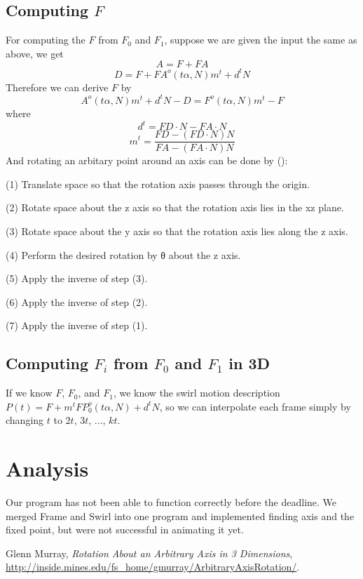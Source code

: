 \documentclass[twoside,11pt]{article}
\begin{document}
\subsection{Computing $F$}
For computing the $F$ from $F_0$ and $F_1$, suppose we are given the input the same as above, we get
\begin{equation}
A = F + FA
\end{equation}
\begin{equation}
D = F + FA^o (t\alpha, N) m^t + d^t N
\end{equation}
Therefore we can derive $F$ by
\begin{equation}
A^o (t\alpha, N) m^t + d^t N - D = F^o (t\alpha, N) m^t - F
\end{equation}
where
\begin{equation}
d^t = FD \cdot N - FA \cdot N 
\end{equation}
\begin{equation}
m^t = \frac{FD - (FD \cdot N) N }{FA - (FA \cdot N) N}
\end{equation}
And rotating an arbitary point around an axis can be done by (\cite{murray13}): 

(1) Translate space so that the rotation axis passes through the origin.

(2) Rotate space about the z axis so that the rotation axis lies in the xz plane.

(3) Rotate space about the y axis so that the rotation axis lies along the z axis.

(4) Perform the desired rotation by θ about the z axis.

(5) Apply the inverse of step (3).

(6) Apply the inverse of step (2).

(7) Apply the inverse of step (1).

\subsection{Computing $F_i$ from $F_0$ and $F_1$ in 3D}
If we know $F$, $F_0$, and $F_1$, we know the swirl motion description $P(t) = F + m^t FP_0^o(t\alpha, N) + d^t N$, so we can interpolate each frame simply by changing $t$ to $2t$, $3t$, $\ldots$, $kt$.

\section{Analysis}
Our program has not been able to function correctly before the deadline. We merged Frame and Swirl into one program and implemented finding axis and the fixed point, but were not successful in animating it yet.






\begin{thebibliography}{9}
  Glenn Murray,
  \emph{Rotation About an Arbitrary Axis in 3 Dimensions},
  \url{http://inside.mines.edu/fs_home/gmurray/ArbitraryAxisRotation/}.

\end{thebibliography}
\end{document}
